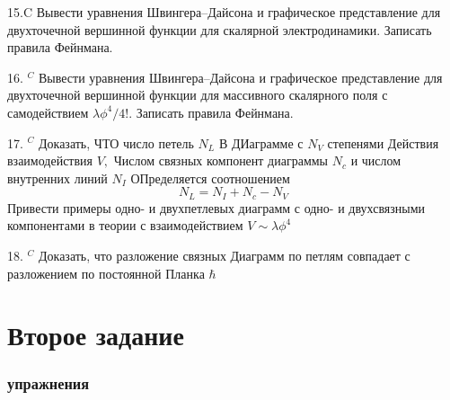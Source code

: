 \documentclass[a4paper,12pt]{article} %
\begin{document}
\begin{ttask}

15.C Вывести уравнения Швингера–Дайсона и графическое представление для двухточечной вершинной функции для скалярной электродинамики. Записать правила Фейнмана. 



\end{ttask}



\begin{ttask}

16. $^{C}$ Вывести уравнения Швингера–Дайсона и графическое представление для двухточечной вершинной функции для массивного скалярного поля с самодействием $\lambda \phi^{4} / 4 ! .$ Записать правила Фейнмана.


\end{ttask}



\begin{ttask}

17. $^{C}$ Доказать, ЧТО число петель $N_{L}$ В ДИаграмме с $N_{V}$ степенями Действия взаимодействия $V,$ Числом связных компонент диаграммы $N_{c}$ и числом внутренних линий $N_{I}$ ОПределяется соотношением
$$
N_{L}=N_{I}+N_{c}-N_{V}
$$
Привести примеры одно- и двухпетлевых диаграмм с одно- и двухсвязными компонентами в теории с взаимодействием $V \sim \lambda \phi^{4}$


\end{ttask}



\begin{ttask}


18. $^{C}$ Доказать, что разложение связных Диаграмм по петлям совпадает с разложением по постоянной Планка $\hbar$

\end{ttask}













\clearpage
\part{Второе задание}


\section{упражнения}
\end{document}
